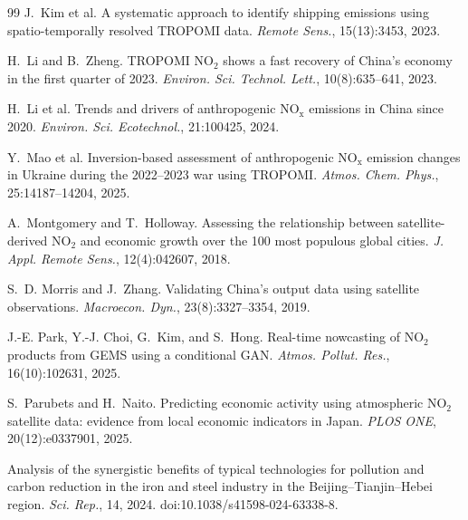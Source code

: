 \documentclass[11pt,a4paper]{article}
\providecommand{\ce}[1]{\ensuremath{\mathrm{#1}}}
\begin{document}
\begin{thebibliography}{99}
J.~Kim et al.
\newblock A systematic approach to identify shipping emissions using spatio-temporally resolved
TROPOMI data.
\newblock \emph{Remote Sens.}, 15(13):3453, 2023.

H.~Li and B.~Zheng.
\newblock TROPOMI \ce{NO_2} shows a fast recovery of China's economy in the first quarter of 2023.
\newblock \emph{Environ. Sci. Technol. Lett.}, 10(8):635--641, 2023.

H.~Li et al.
\newblock Trends and drivers of anthropogenic \ce{NO_x} emissions in China since 2020.
\newblock \emph{Environ. Sci. Ecotechnol.}, 21:100425, 2024.

Y.~Mao et al.
\newblock Inversion-based assessment of anthropogenic \ce{NO_x} emission changes in Ukraine during
the 2022--2023 war using TROPOMI.
\newblock \emph{Atmos. Chem. Phys.}, 25:14187--14204, 2025.

A.~Montgomery and T.~Holloway.
\newblock Assessing the relationship between satellite-derived \ce{NO_2} and economic growth over
the 100 most populous global cities.
\newblock \emph{J. Appl. Remote Sens.}, 12(4):042607, 2018.

S.~D. Morris and J.~Zhang.
\newblock Validating China's output data using satellite observations.
\newblock \emph{Macroecon. Dyn.}, 23(8):3327--3354, 2019.

J.-E. Park, Y.-J. Choi, G.~Kim, and S.~Hong.
\newblock Real-time nowcasting of \ce{NO_2} products from GEMS using a conditional GAN.
\newblock \emph{Atmos. Pollut. Res.}, 16(10):102631, 2025.

S.~Parubets and H.~Naito.
\newblock Predicting economic activity using atmospheric \ce{NO_2} satellite data: evidence from
local economic indicators in Japan.
\newblock \emph{PLOS ONE}, 20(12):e0337901, 2025.

Analysis of the synergistic benefits of typical technologies for pollution and carbon reduction in
the iron and steel industry in the Beijing--Tianjin--Hebei region.
\newblock \emph{Sci. Rep.}, 14, 2024. doi:10.1038/s41598-024-63338-8.

\end{thebibliography}
\end{document}
